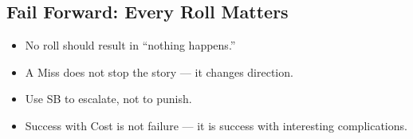 \subsection{Fail Forward: Every Roll Matters}
\begin{itemize}
  \item No roll should result in ``nothing happens.''
  \item A Miss does not stop the story — it changes direction.
  \item Use SB to escalate, not to punish.
  \item Success with Cost is not failure — it is success with interesting complications.
\end{itemize}


